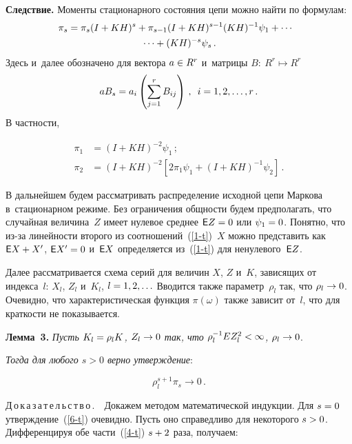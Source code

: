 \begin{multicols}{2}
\smallskip

\noindent
\textbf{Следствие.}  Моменты стационарного состояния цепи можно найти по формулам:
\begin{multline*}
\hspace*{-6pt}\pi_s=\pi_s(I+KH)^s+ \pi_{s-1}(I+KH)^{s-1} (KH)^{-1}\psi_1+\cdots {}\\
{}\cdots +(KH)^{-s}\psi_s\,.
\end{multline*}
Здесь и~далее обозначено для вектора $a\hm\in R^r$ и~мат\-ри\-цы $B:\ R^r \mapsto R^r$
$$
aB_s=a_i\left(\sum_{j=1}^r B_{ij}\right)\,,\enskip i=1,2,\ldots,r\,.
$$
В частности,

\noindent
\begin{align*}
\pi_1&=(I+KH)^{-2}\psi_1\,;\\
\pi_2&=(I+KH)^{-2}[2\pi_1\psi_1+(I+KH)^{-1}\psi_2]\,.
\end{align*}

В дальнейшем будем рассматривать распределение исходной цепи Маркова
в~стационарном режиме. Без ограничения общности будем предполагать, что
случайная величина~$Z$ имеет нулевое среднее ${\sf E}Z\hm=0$ или $\psi_1\hm=0$.
Понятно, что из-за линейности второго из соотношений~(\ref{1-t})~$X$ можно
представить как ${\sf E}X\hm+X'$, ${\sf E}X'\hm=0$ и~${\sf E}X$
определяется из~(\ref{1-t}) для ненулевого~${\sf E}Z$.

Далее рассматривается схема серий для величин $X$, $Z$ и~$K$,
зависящих от индекса~$l$: $X_l$, $Z_l$ и~$K_l$, $l\hm=1, 2,\ldots$
Вводится также параметр~$\rho_l$ так, что $\rho_l\hm\rightarrow 0$.
Очевидно, что характеристическая функция $\pi(\omega)$ также зависит от~$l$,
что для краткости не показывается.

\smallskip

\noindent
\textbf{Лемма~3.} \textit{Пусть $K_l\hm=\rho_l K$, $Z_l \hm\rightarrow 0$ так, что $\rho_l^{-1} EZ_l^2\hm < \infty$, $\rho_l\hm \rightarrow 0$}.

\textit{Тогда для любого $s > 0$ верно утверждение}:

\vspace*{2pt}

\noindent
\begin{equation}
\rho_l^{s+1}\pi_s\rightarrow 0\,.
\label{6-t}
\end{equation}

\noindent
 Д\,о\,к\,а\,з\,а\,т\,е\,л\,ь\,с\,т\,в\,о\,.\ \ Докажем методом математической
 индукции. Для $s\hm=0$ утверждение~(\ref{6-t}) очевидно. Пусть оно
 справедливо для некоторого $s\hm>0$. Дифференцируя обе
 части~(\ref{4-t}) $s\hm+2$ раза, получаем:


\end{multicols}
